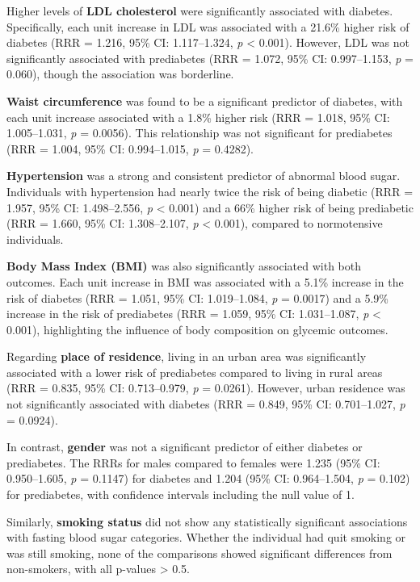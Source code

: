 \documentclass[
  letterpaper,
  DIV=11,
  numbers=noendperiod]{scrartcl}
\begin{document}
Higher levels of \textbf{LDL cholesterol} were significantly associated
with diabetes. Specifically, each unit increase in LDL was associated
with a 21.6\% higher risk of diabetes (RRR = 1.216, 95\% CI:
1.117--1.324, \emph{p} \textless{} 0.001). However, LDL was not
significantly associated with prediabetes (RRR = 1.072, 95\% CI:
0.997--1.153, \emph{p} = 0.060), though the association was borderline.

\textbf{Waist circumference} was found to be a significant predictor of
diabetes, with each unit increase associated with a 1.8\% higher risk
(RRR = 1.018, 95\% CI: 1.005--1.031, \emph{p} = 0.0056). This
relationship was not significant for prediabetes (RRR = 1.004, 95\% CI:
0.994--1.015, \emph{p} = 0.4282).

\textbf{Hypertension} was a strong and consistent predictor of abnormal
blood sugar. Individuals with hypertension had nearly twice the risk of
being diabetic (RRR = 1.957, 95\% CI: 1.498--2.556, \emph{p} \textless{}
0.001) and a 66\% higher risk of being prediabetic (RRR = 1.660, 95\%
CI: 1.308--2.107, \emph{p} \textless{} 0.001), compared to normotensive
individuals.

\textbf{Body Mass Index (BMI)} was also significantly associated with
both outcomes. Each unit increase in BMI was associated with a 5.1\%
increase in the risk of diabetes (RRR = 1.051, 95\% CI: 1.019--1.084,
\emph{p} = 0.0017) and a 5.9\% increase in the risk of prediabetes (RRR
= 1.059, 95\% CI: 1.031--1.087, \emph{p} \textless{} 0.001),
highlighting the influence of body composition on glycemic outcomes.

Regarding \textbf{place of residence}, living in an urban area was
significantly associated with a lower risk of prediabetes compared to
living in rural areas (RRR = 0.835, 95\% CI: 0.713--0.979, \emph{p} =
0.0261). However, urban residence was not significantly associated with
diabetes (RRR = 0.849, 95\% CI: 0.701--1.027, \emph{p} = 0.0924).

In contrast, \textbf{gender} was not a significant predictor of either
diabetes or prediabetes. The RRRs for males compared to females were
1.235 (95\% CI: 0.950--1.605, \emph{p} = 0.1147) for diabetes and 1.204
(95\% CI: 0.964--1.504, \emph{p} = 0.102) for prediabetes, with
confidence intervals including the null value of 1.

Similarly, \textbf{smoking status} did not show any statistically
significant associations with fasting blood sugar categories. Whether
the individual had quit smoking or was still smoking, none of the
comparisons showed significant differences from non-smokers, with all
p-values \textgreater{} 0.5.
\end{document}
